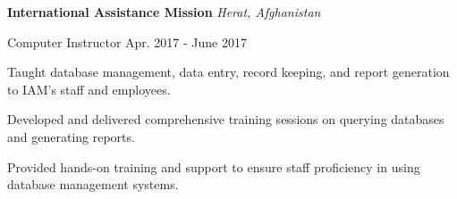 \begin{cventries}
\begin{rSection}{}{\bodyfont\bfseries\color{black} \hspace{-1.6em} {International Assistance Mission}} \hfill{\bodyfont\slshape\color{awesome} {Herat, Afghanistan} \vspace{0.3em}}
\end{rSection}

  \cventry
    {Computer Instructor \vspace{0.1em}} %
    {} %
    {} %
    {\vspace{-0.1em}Apr. 2017 - June 2017} %
    {
      \begin{cvitems} %
        \item[] {Taught database management, data entry, record keeping, and report generation to IAM's staff and employees.}
        \item[] {Developed and delivered comprehensive training sessions on querying databases and generating reports.}
        \item[] {Provided hands-on training and support to ensure staff proficiency in using database management systems.}
      \end{cvitems}
    }
\end{cventries}
